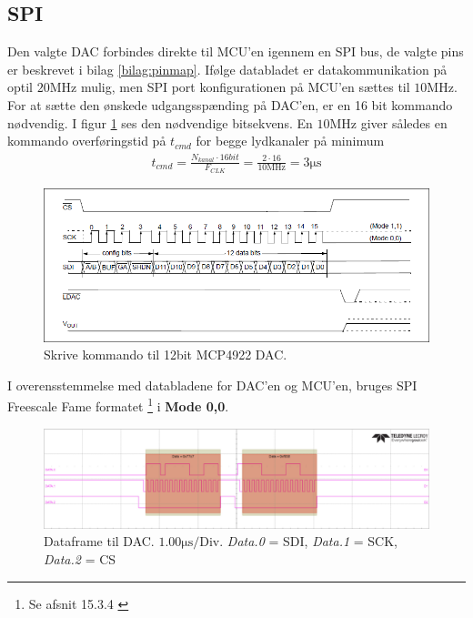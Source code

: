 \subsection{SPI}
Den valgte DAC forbindes direkte til MCU'en igennem en SPI bus, de valgte pins er beskrevet i bilag \ref{bilag:pinmap}.
Ifølge databladet er datakommunikation på optil $20\si{\mega\hertz}$ mulig, men SPI port konfigurationen på MCU'en sættes til $10\si{\mega\hertz}$.
For at sætte den ønskede udgangsspænding på DAC'en, er en 16 bit kommando nødvendig. 
I figur \ref{fig:dac12bit_writecmd} ses den nødvendige bitsekvens.
En $10\si{\mega\hertz}$ giver således en kommando overføringstid på $t_{cmd}$ for begge lydkanaler på minimum 
\begin{align}
	t_{cmd} = \frac{N_{kanal} \cdot 16bit}{F_{CLK}} = \frac{2 \cdot 16}{10\si{\mega\hertz}} = 3\si{\micro\second}
\end{align}

\begin{figure}[h!]
	\centering
	\includegraphics[width=.8\textwidth]{billeder/dac12bit_writecmd.png}
	\caption{Skrive kommando til 12bit MCP4922 DAC.\cite[s. 25]{mcp4922}}
	\label{fig:dac12bit_writecmd}
\end{figure}

I overensstemmelse med databladene for DAC'en og MCU'en, bruges SPI Freescale Fame formatet \footnote{Se afsnit 15.3.4 \cite[s. 954]{tm4c123gh6pm}} i \textbf{Mode 0,0}.

\begin{figure}[h!]
	\centering
	\includegraphics[width=\textwidth]{billeder/dac_dataframe.png}
	\caption{Dataframe til DAC. $1.00\si{\micro\second}\text{/Div}$. \textit{Data.0} = SDI, \textit{Data.1} = SCK, \textit{Data.2} = CS}
	\label{fig:dac_dataframe}
\end{figure}

